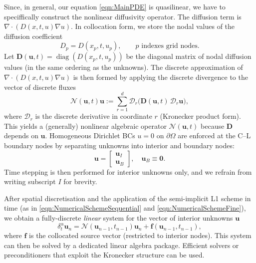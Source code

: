 \documentclass[12pt,a4paper]{article}
\begin{document}
Since, in general, our equation \eqref{eqn:MainPDE} is quasilinear, we have to speciffically construct the nonlinear diffusivity operator. The diffusion term is \(\nabla \cdot (D(x,t,u)\nabla u)\). In collocation form, we store the nodal values of the diffusion coefficient
\begin{equation}
	D_{p} = D(x_p,t,u_p),\qquad p \text{ indexes grid nodes}.
\end{equation}
Let \(\mathbf{D}(\mathbf{u},t)=\operatorname{diag}(D(x_p,t,u_p))\) be the diagonal matrix of nodal diffusion values (in the same ordering as the unknowns). The discrete approximation of \(\nabla \cdot (D(x,t,u)\nabla u)\) is then formed by applying the discrete divergence to the vector of discrete fluxes
\begin{equation}
	\mathcal{N}(\mathbf{u},t) \mathbf{u} := \sum_{r=1}^d \mathcal{D}_r\!\big(\mathbf{D}(\mathbf{u},t)\,\mathcal{D}_r\mathbf{u}\big),
\end{equation}
where \(\mathcal{D}_r\) is the discrete derivative in coordinate \(r\) (Kronecker product form). This yields a (generally) nonlinear algebraic operator \(\mathcal{N}(\mathbf{u},t)\) because \(\mathbf{D}\) depends on \(\mathbf{u}\). Homogeneous Dirichlet BCs \(u=0\) on \(\partial\Omega\) are enforced at the C--L boundary nodes by separating unknowns into interior and boundary nodes:
\begin{equation}
	\mathbf{u} = \begin{bmatrix}\mathbf{u}_I\\ \mathbf{u}_B\end{bmatrix}, \quad \mathbf{u}_B \equiv \mathbf{0}.
\end{equation}
Time stepping is then performed for interior unknowns only, and we refrain from writing subscript $I$ for brevity.

After spatial discretisation and the application of the semi-implicit L1 scheme in time (as in \eqref{eqn:NumericalSchemeSequential} and \eqref{eqn:NumericalSchemeFine}), we obtain a fully-discrete \textit{linear} system for the vector of interior unknowns \(\mathbf{u}\)
\begin{equation}\label{eqn:NumericalSchemeMainSystem}
	\delta_t^\alpha \mathbf{u}_n = \mathcal{N}\left(\mathbf{u}_{n-1} ,t_{n-1}\right) \mathbf{u}_n + \mathbf{f}\left(\mathbf{u}_{n-1} , t_{n-1}\right),
\end{equation}
where \(\mathbf{f}\) is the collocated source vector (restricted to interior nodes). This system can then be solved by a dedicated linear algebra package. Efficient solvers or preconditioners that exploit the Kronecker structure can be used.
\end{document}
